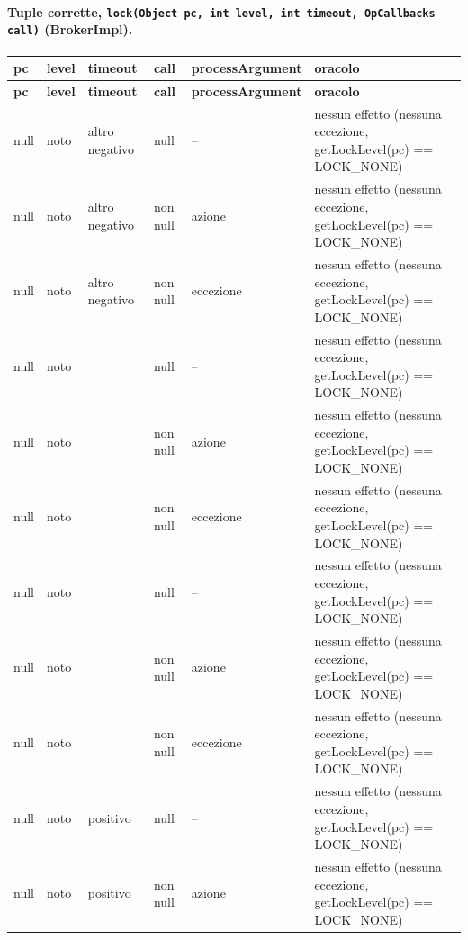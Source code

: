 \paragraph*{Tuple corrette, \texttt{lock(Object pc, int level, int timeout, OpCallbacks call)} (BrokerImpl).}

{\footnotesize\setlength{\tabcolsep}{3pt}
\begin{longtable}{>{\raggedright\arraybackslash}p{}>{\raggedright\arraybackslash}p{}>{\raggedright\arraybackslash}p{}>{\raggedright\arraybackslash}p{}>{\raggedright\arraybackslash}p{}>{\raggedright\arraybackslash}p{}}
\toprule
\textbf{pc} & \textbf{level} & \textbf{timeout} & \textbf{call} & \textbf{processArgument} & \textbf{oracolo} \\
\midrule
\endfirsthead
\toprule
\textbf{pc} & \textbf{level} & \textbf{timeout} & \textbf{call} & \textbf{processArgument} & \textbf{oracolo} \\
\midrule
\endhead
\bottomrule
\endfoot
null & noto & altro negativo & null & -- & nessun effetto (nessuna eccezione, getLockLevel(pc) == LOCK\_NONE) \\
null & noto & altro negativo & non null & azione & nessun effetto (nessuna eccezione, getLockLevel(pc) == LOCK\_NONE) \\
null & noto & altro negativo & non null & eccezione & nessun effetto (nessuna eccezione, getLockLevel(pc) == LOCK\_NONE) \\
null & noto & -1 & null & -- & nessun effetto (nessuna eccezione, getLockLevel(pc) == LOCK\_NONE) \\
null & noto & -1 & non null & azione & nessun effetto (nessuna eccezione, getLockLevel(pc) == LOCK\_NONE) \\
null & noto & -1 & non null & eccezione & nessun effetto (nessuna eccezione, getLockLevel(pc) == LOCK\_NONE) \\
null & noto & 0 & null & -- & nessun effetto (nessuna eccezione, getLockLevel(pc) == LOCK\_NONE) \\
null & noto & 0 & non null & azione & nessun effetto (nessuna eccezione, getLockLevel(pc) == LOCK\_NONE) \\
null & noto & 0 & non null & eccezione & nessun effetto (nessuna eccezione, getLockLevel(pc) == LOCK\_NONE) \\
null & noto & positivo & null & -- & nessun effetto (nessuna eccezione, getLockLevel(pc) == LOCK\_NONE) \\
null & noto & positivo & non null & azione & nessun effetto (nessuna eccezione, getLockLevel(pc) == LOCK\_NONE) \\

\end{longtable}}
